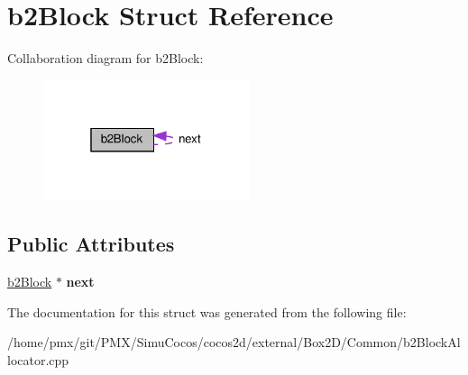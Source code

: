 \hypertarget{structb2Block}{}\section{b2\+Block Struct Reference}
\label{structb2Block}


Collaboration diagram for b2\+Block\+:
\nopagebreak
\begin{figure}[H]
\begin{center}
\leavevmode
\includegraphics[width=172pt]{structb2Block__coll__graph}
\end{center}
\end{figure}
\subsection*{Public Attributes}
\begin{DoxyCompactItemize}
\item 
\mbox{\label{structb2Block_a4b410d4fd7ad2a117c70776f60cb2738}} 
\hyperlink{structb2Block}{b2\+Block} $\ast$ {\bfseries next}
\end{DoxyCompactItemize}


The documentation for this struct was generated from the following file\+:\begin{DoxyCompactItemize}
\item 
/home/pmx/git/\+P\+M\+X/\+Simu\+Cocos/cocos2d/external/\+Box2\+D/\+Common/b2\+Block\+Allocator.\+cpp\end{DoxyCompactItemize}
